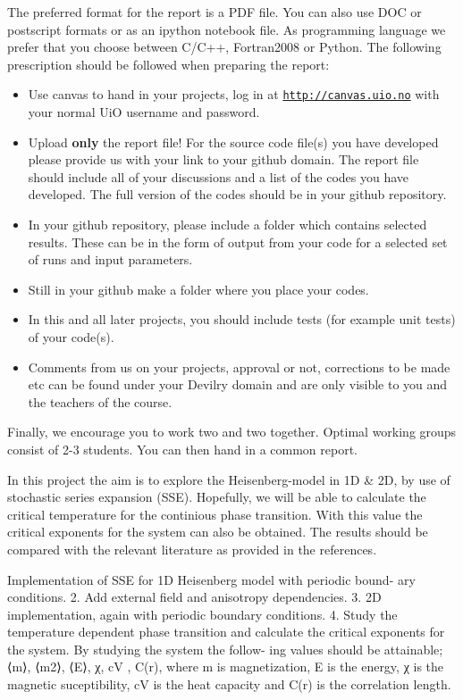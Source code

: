 \documentclass[%
oneside,                 %
final,                   %
10pt]{article}
\begin{document}
The preferred format for the report is a PDF file. You can also use DOC or postscript formats or as an ipython notebook file.  As programming language we prefer that you choose between C/C++, Fortran2008 or Python. The following prescription should be followed when preparing the report:

\begin{itemize}
  \item Use canvas to hand in your projects, log in  at  \href{{http://canvas.uio.no}}{\nolinkurl{http://canvas.uio.no}} with your normal UiO username and password.

  \item Upload \textbf{only} the report file!  For the source code file(s) you have developed please provide us with your link to your github domain.  The report file should include all of your discussions and a list of the codes you have developed.  The full version of the codes should be in your github repository.

  \item In your github repository, please include a folder which contains selected results. These can be in the form of output from your code for a selected set of runs and input parameters.

  \item Still in your github make a folder where you place your codes. 

  \item In this and all later projects, you should include tests (for example unit tests) of your code(s).

  \item Comments  from us on your projects, approval or not, corrections to be made  etc can be found under your Devilry domain and are only visible to you and the teachers of the course.
\end{itemize}

\noindent
Finally, 
we encourage you to work two and two together. Optimal working groups consist of 
2-3 students. You can then hand in a common report. 

In this project the aim is to explore the Heisenberg-model in 1D {\&} 2D, by use of stochastic series expansion (SSE). Hopefully, we will be able to calculate the critical temperature for the continious phase transition. With this value the critical exponents for the system can also be obtained.
The results should be compared with the relevant literature as provided in the references.

Implementation of SSE for 1D Heisenberg model with periodic bound- ary conditions.
2. Add external field and anisotropy dependencies.
3. 2D implementation, again with periodic boundary conditions.
4. Study the temperature dependent phase transition and calculate the critical exponents for the system. By studying the system the follow- ing values should be attainable; ⟨m⟩, ⟨m2⟩, ⟨E⟩, χ, cV , C(r), where m is magnetization, E is the energy, χ is the magnetic suceptibility, cV is the heat capacity and C(r) is the correlation length.


\end{document}
